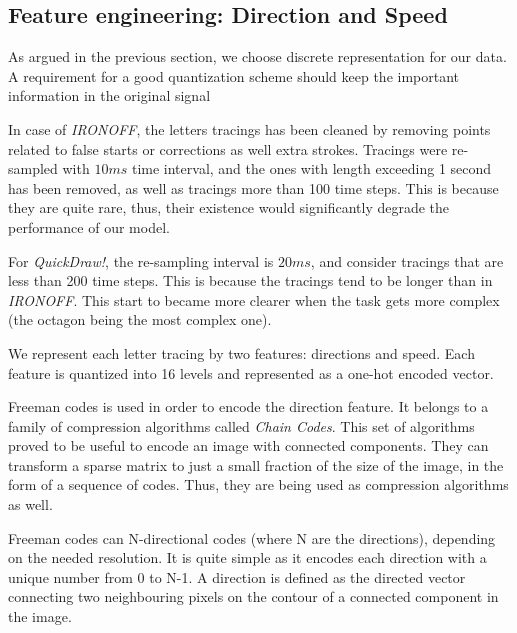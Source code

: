   \subsection{Feature engineering: Direction and Speed}
    \par As argued in the previous section, we choose discrete representation for our data. A requirement for a good quantization scheme should keep the important information in the original signal

    \par In case of \textit{IRONOFF}, the letters tracings has been cleaned by removing points related to false starts or corrections as well extra strokes. Tracings were re-sampled with $10ms$ time interval, and the ones with length exceeding 1 second has been removed, as well as tracings more than 100 time steps. This is because they are quite rare, thus, their existence would significantly degrade the performance of our model.

    \par For \textit{QuickDraw!}, the re-sampling interval is $20ms$, and consider tracings that are less than 200 time steps. This is because the tracings tend to be longer than in \textit{IRONOFF}. This start to became more clearer when the task gets more complex (the octagon being the most complex one).

    \par We represent each letter tracing by two features: directions and speed. Each feature is quantized into 16 levels and represented as a one-hot encoded vector.

    \par Freeman codes \citep{freeman1961encoding} is used in order to encode the direction feature. It belongs to a family of compression algorithms called \textit{Chain Codes}. This set of algorithms proved to be useful to encode an image with connected components. They can transform a sparse matrix to just a small fraction of the size of the image, in the form of a sequence of codes. Thus, they are being used as compression algorithms as well.

    \par Freeman codes can N-directional codes (where N are the directions), depending on the needed resolution. It is quite simple as it encodes each direction with a unique number from 0 to N-1. A direction is defined as the directed vector connecting two neighbouring pixels on the contour of a connected component in the image.

